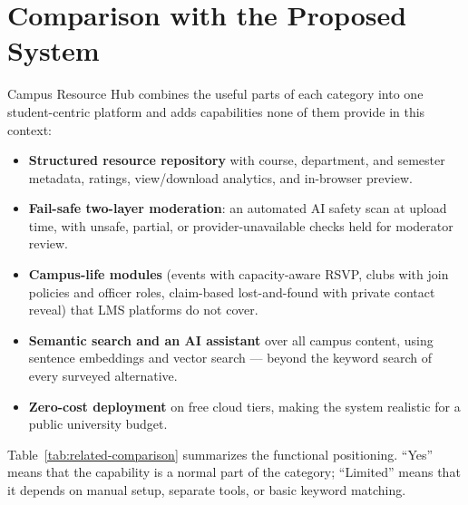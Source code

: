\documentclass[12pt,a4paper]{report}
\begin{document}
\section{Comparison with the Proposed System}
Campus Resource Hub combines the useful parts of each category into
one student-centric platform and adds capabilities none of them
provide in this context:
\begin{itemize}[itemsep=2pt]
  \item \textbf{Structured resource repository} with course,
        department, and semester metadata, ratings, view/download
        analytics, and in-browser preview.
  \item \textbf{Fail-safe two-layer moderation}: an automated AI
        safety scan at upload time, with unsafe, partial, or
        provider-unavailable checks held for moderator review.
  \item \textbf{Campus-life modules} (events with capacity-aware
        RSVP, clubs with join policies and officer roles, claim-based
        lost-and-found with private contact reveal) that LMS
        platforms do not cover.
  \item \textbf{Semantic search and an AI assistant} over all campus
        content, using sentence embeddings and vector search ---
        beyond the keyword search of every surveyed alternative.
  \item \textbf{Zero-cost deployment} on free cloud tiers, making
        the system realistic for a public university budget.
\end{itemize}

Table~\ref{tab:related-comparison} summarizes the functional
positioning. ``Yes'' means that the capability is a normal part of
the category; ``Limited'' means that it depends on manual setup,
separate tools, or basic keyword matching.
\end{document}
